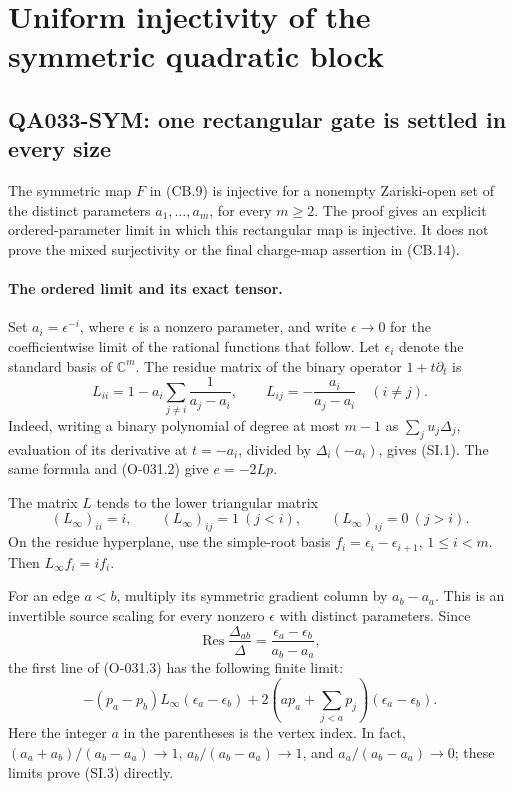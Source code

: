 \section{Uniform injectivity of the symmetric quadratic block}

\subsection*{QA033-SYM: one rectangular gate is settled in every size}
The symmetric map \(F\) in (CB.9) is injective for a nonempty
Zariski-open set of the distinct parameters \(a_1,\ldots,a_m\),
for every \(m\geq2\). The proof gives an explicit ordered-parameter
limit in which this rectangular map is injective. It does not
prove the mixed surjectivity or the final charge-map assertion
in (CB.14).

\paragraph{The ordered limit and its exact tensor.}
Set \(a_i=\epsilon^{-i}\), where \(\epsilon\) is a nonzero
parameter, and write \(\epsilon\to0\) for the coefficientwise
limit of the rational functions that follow. Let
\(\epsilon_i\) denote the standard basis of \(\mathbb C^m\).
The residue matrix of the binary operator \(1+t\partial_t\)
is
\[
 L_{ii}=1-a_i\sum_{j\ne i}\frac1{a_j-a_i},\qquad
 L_{ij}=-\frac{a_i}{a_j-a_i}\quad(i\ne j).
                                                               \tag{SI.1}
\]
Indeed, writing a binary polynomial of degree at most \(m-1\)
as \(\sum_j u_j\Delta_j\), evaluation of its derivative at
\(t=-a_i\), divided by \(\Delta_i(-a_i)\), gives (SI.1).
The same formula and (O-031.2) give \(e=-2Lp\).

The matrix \(L\) tends to the lower triangular matrix
\[
 (L_\infty)_{ii}=i,\qquad
 (L_\infty)_{ij}=1\ (j<i),\qquad
 (L_\infty)_{ij}=0\ (j>i).
                                                               \tag{SI.2}
\]
On the residue hyperplane, use the simple-root basis
\(f_i=\epsilon_i-\epsilon_{i+1}\), \(1\leq i<m\).
Then \(L_\infty f_i=i f_i\).

For an edge \(a<b\), multiply its symmetric gradient column
by \(a_b-a_a\). This is an invertible source scaling for every
nonzero \(\epsilon\) with distinct parameters. Since
\[
 \operatorname{Res}\frac{\Delta_{ab}}{\Delta}
                    =\frac{\epsilon_a-\epsilon_b}{a_b-a_a},
\]
the first line of (O-031.3) has the following finite limit:
\[
 -(p_a-p_b)L_\infty(\epsilon_a-\epsilon_b)
       +2\left(a p_a+\sum_{j<a}p_j\right)(\epsilon_a-\epsilon_b).
                                                               \tag{SI.3}
\]
Here the integer \(a\) in the parentheses is the vertex index.
In fact, \((a_a+a_b)/(a_b-a_a)\to1\),
\(a_b/(a_b-a_a)\to1\), and
\(a_a/(a_b-a_a)\to0\); these limits prove (SI.3) directly.

